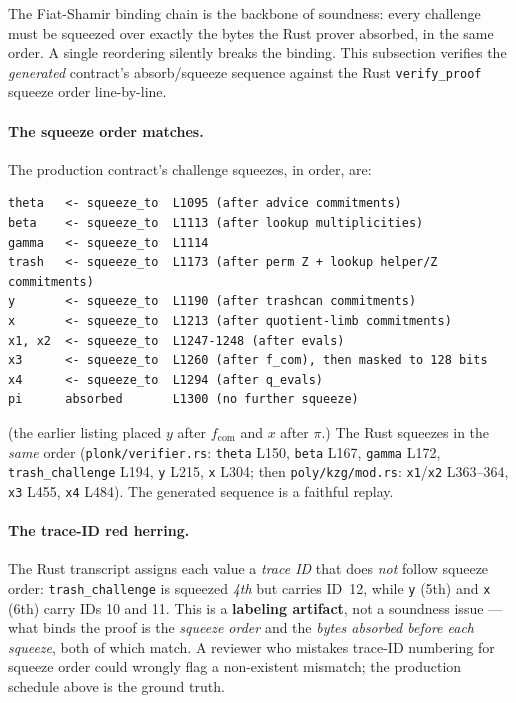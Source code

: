 The Fiat-Shamir binding chain is the backbone of soundness: every
challenge must be squeezed over exactly the bytes the Rust prover
absorbed, in the same order. A single reordering silently breaks the
binding. This subsection verifies the \emph{generated} contract's
absorb/squeeze sequence against the Rust \texttt{verify\_proof}
squeeze order line-by-line.

\paragraph{The squeeze order matches.} The production contract's
challenge squeezes, in order, are:
\begin{lstlisting}[style=plain]
theta   <- squeeze_to  L1095 (after advice commitments)
beta    <- squeeze_to  L1113 (after lookup multiplicities)
gamma   <- squeeze_to  L1114
trash   <- squeeze_to  L1173 (after perm Z + lookup helper/Z commitments)
y       <- squeeze_to  L1190 (after trashcan commitments)
x       <- squeeze_to  L1213 (after quotient-limb commitments)
x1, x2  <- squeeze_to  L1247-1248 (after evals)
x3      <- squeeze_to  L1260 (after f_com), then masked to 128 bits
x4      <- squeeze_to  L1294 (after q_evals)
pi      absorbed       L1300 (no further squeeze)
\end{lstlisting}
 (the earlier listing placed $y$ after
$f_\text{com}$ and $x$ after $\pi$.) The Rust squeezes in the
\emph{same} order (\texttt{plonk/verifier.rs}: \texttt{theta} L150,
\texttt{beta} L167, \texttt{gamma} L172, \texttt{trash\_challenge} L194,
\texttt{y} L215, \texttt{x} L304; then \texttt{poly/kzg/mod.rs}:
\texttt{x1}/\texttt{x2} L363--364, \texttt{x3} L455, \texttt{x4} L484).
The generated sequence is a faithful replay.

\paragraph{The trace-ID red herring.} The Rust transcript assigns
each value a \emph{trace ID} that does \emph{not} follow squeeze
order: \texttt{trash\_challenge} is squeezed \emph{4th} but carries
ID~12, while \texttt{y} (5th) and \texttt{x} (6th) carry IDs 10 and
11. This is a \textbf{labeling artifact}, not a soundness issue ---
what binds the proof is the \emph{squeeze order} and the \emph{bytes
absorbed before each squeeze}, both of which match. A reviewer who
mistakes trace-ID numbering for squeeze order could wrongly flag a
non-existent mismatch; the production schedule above is the ground
truth.

